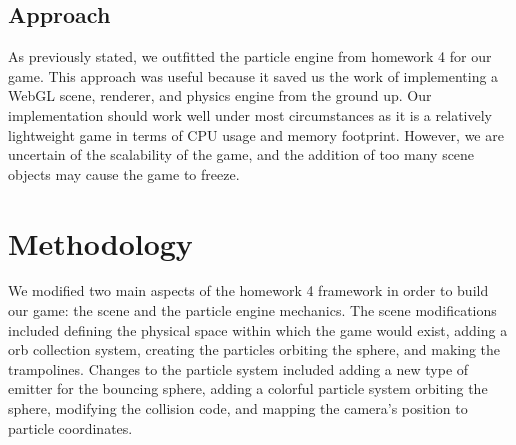 \documentclass[a4paper]{article}
\begin{document}
\subsection{Approach}
As previously stated, we outfitted the particle engine from homework 4 for our game. This approach was useful because it saved us the work of implementing a WebGL scene, renderer, and physics engine from the ground up. Our implementation should work well under most circumstances as it is a relatively lightweight game in terms of CPU usage and memory footprint. However, we are uncertain of the scalability of the game, and the addition of too many scene objects may cause the game to freeze.

\section{Methodology}
We modified two main aspects of the homework 4 framework in order to build our game: the scene and the particle engine mechanics. The scene modifications included defining the physical space within which the game would exist, adding a orb collection system, creating the particles orbiting the sphere, and making the trampolines. Changes to the particle system included adding a new type of emitter for the bouncing sphere, adding a colorful particle system orbiting the sphere, modifying the collision code, and mapping the camera's position to particle coordinates.
\end{document}
